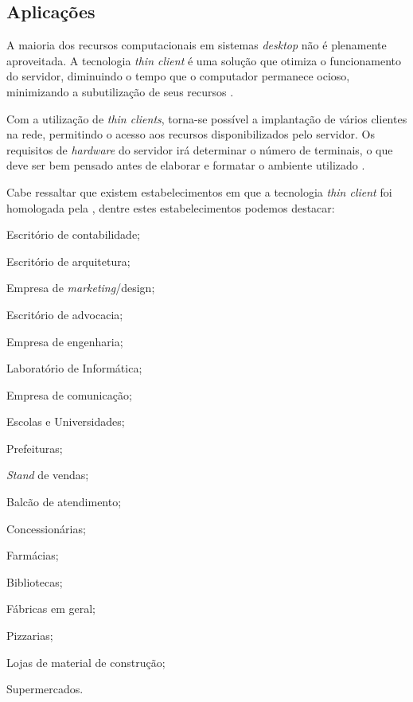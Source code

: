 \documentclass[
	12pt,				%
	openright,			%
	twoside,			%
	a4paper,			%
	chapter=TITLE,		%
	english,			%
	brazil				%
	]{abntex2}
\begin{document}
\subsection{Aplicações}

A maioria dos recursos computacionais em sistemas \textit{desktop} não é plenamente aproveitada. A tecnologia \textit{thin client} é uma solução que otimiza o funcionamento do servidor, diminuindo o tempo que o computador permanece ocioso, minimizando a subutilização de seus recursos \cite{thinclientbrasil}. 

Com a utilização de \textit{thin clients}, torna-se possível a implantação de vários clientes na rede, permitindo o acesso aos recursos disponibilizados pelo servidor. Os requisitos de \textit{hardware} do servidor irá determinar o número de terminais, o que deve ser bem pensado antes de elaborar e formatar o ambiente utilizado \cite{thinclientbrasil}. 

Cabe ressaltar que existem estabelecimentos em que a tecnologia \textit{thin client} foi homologada pela , dentre estes estabelecimentos podemos destacar:


\begin{alineas}
\item Escritório de contabilidade;
\item Escritório de arquitetura;
\item Empresa de \textit{marketing}/design;
\item Escritório de advocacia;
\item Empresa de engenharia;
\item Laboratório de Informática;
\item Empresa de comunicação;
\item Escolas e Universidades;
\item Prefeituras;
\item \textit{Stand} de vendas;
\item Balcão de atendimento;
\item Concessionárias;
\item Farmácias;
\item Bibliotecas;
\item Fábricas em geral;
\item Pizzarias;
\item Lojas de material de construção;
\item Supermercados.
\end{alineas}
\end{document}
